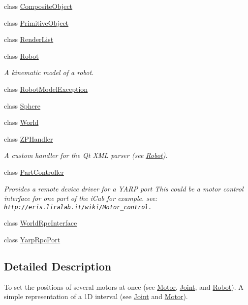 \begin{DoxyCompactItemize}
class \hyperlink{class_robot_model_1_1_composite_object}{CompositeObject}
\item 
class \hyperlink{class_robot_model_1_1_primitive_object}{PrimitiveObject}
\item 
class \hyperlink{class_robot_model_1_1_render_list}{RenderList}
\item 
class \hyperlink{class_robot_model_1_1_robot}{Robot}
\begin{DoxyCompactList}\small\item\em A kinematic model of a robot. \item\end{DoxyCompactList}\item 
class \hyperlink{class_robot_model_1_1_robot_model_exception}{RobotModelException}
\item 
class \hyperlink{class_robot_model_1_1_sphere}{Sphere}
\item 
class \hyperlink{class_robot_model_1_1_world}{World}
\item 
class \hyperlink{class_robot_model_1_1_z_p_handler}{ZPHandler}
\begin{DoxyCompactList}\small\item\em A custom handler for the Qt XML parser (see \hyperlink{class_robot_model_1_1_robot}{Robot}). \item\end{DoxyCompactList}\item 
class \hyperlink{class_robot_model_1_1_part_controller}{PartController}
\begin{DoxyCompactList}\small\item\em Provides a remote device driver for a YARP port This could be a motor control interface for one part of the iCub for example. see: \href{http://eris.liralab.it/wiki/Motor_control.}{\tt http://eris.liralab.it/wiki/Motor\_\-control.} \item\end{DoxyCompactList}\item 
class \hyperlink{class_robot_model_1_1_world_rpc_interface}{WorldRpcInterface}
\item 
class \hyperlink{class_robot_model_1_1_yarp_rpc_port}{YarpRpcPort}
\end{DoxyCompactItemize}


\subsection{Detailed Description}
To set the positions of several motors at once (see \hyperlink{class_robot_model_1_1_motor}{Motor}, \hyperlink{class_robot_model_1_1_joint}{Joint}, and \hyperlink{class_robot_model_1_1_robot}{Robot}). A simple representation of a 1D interval (see \hyperlink{class_robot_model_1_1_joint}{Joint} and \hyperlink{class_robot_model_1_1_motor}{Motor}).

